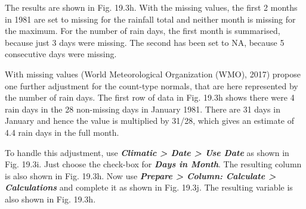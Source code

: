 \documentclass[
  letterpaper,
  DIV=11,
  numbers=noendperiod]{scrreprt}
\begin{document}
The results are shown in Fig. 19.3h. With the missing values, the first
2 months in 1981 are set to missing for the rainfall total and neither
month is missing for the maximum. For the number of rain days, the first
month is summarised, because just 3 days were missing. The second has
been set to NA, because 5 consecutive days were missing.

With missing values (World Meteorological Organization (WMO), 2017)
propose one further adjustment for the count-type normals, that are here
represented by the number of rain days. The first row of data in Fig.
19.3h shows there were 4 rain days in the 28 non-missing days in January
1981. There are 31 days in January and hence the value is multiplied by
31/28, which gives an estimate of 4.4 rain days in the full month.

To handle this adjustment, use \textbf{\emph{Climatic \textgreater{}
Date \textgreater{} Use Date}} as shown in Fig. 19.3i. Just choose the
check-box for \textbf{\emph{Days in Month}}. The resulting column is
also shown in Fig. 19.3h. Now use \textbf{\emph{Prepare \textgreater{}
Column: Calculate \textgreater{} Calculations}} and complete it as shown
in Fig. 19.3j. The resulting variable is also shown in Fig. 19.3h.
\end{document}
